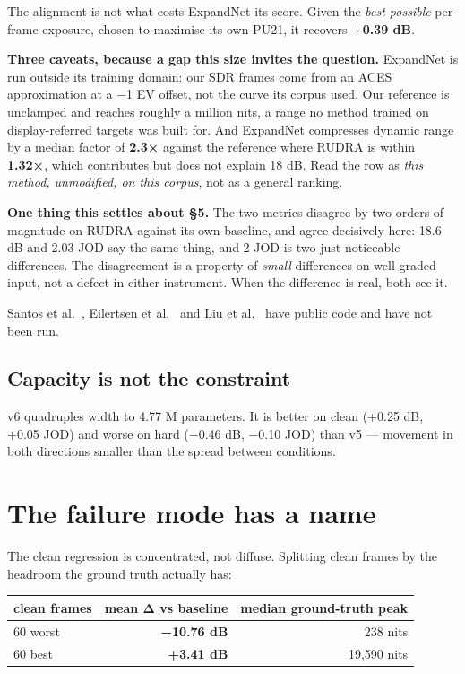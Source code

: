 The alignment is not what costs ExpandNet its score. Given the \emph{best possible}
per-frame exposure, chosen to maximise its own PU21, it recovers \textbf{+0.39 dB}.

\textbf{Three caveats, because a gap this size invites the question.} ExpandNet is
run outside its training domain: our SDR frames come from an ACES approximation
at a −1 EV offset, not the curve its corpus used. Our reference is unclamped and
reaches roughly a million nits, a range no method trained on display-referred targets
was built for. And ExpandNet compresses dynamic range by a median factor of
\textbf{2.3×} against the reference where RUDRA is within \textbf{1.32×}, which
contributes but does not explain 18 dB. Read the row as \emph{this method,
unmodified, on this corpus}, not as a general ranking.

\textbf{One thing this settles about §5.} The two metrics disagree by two orders of
magnitude on RUDRA against its own baseline, and agree decisively here: 18.6 dB
and 2.03 JOD say the same thing, and 2 JOD is two just-noticeable differences.
The disagreement is a property of \emph{small} differences on well-graded input, not
a defect in either instrument. When the difference is real, both see it.

Santos et al.~\cite{santos2020}, Eilertsen et al.~\cite{eilertsen2017} and Liu et al.~\cite{liu2020} have public code and
have not been run.

\hypertarget{capacity-is-not-the-constraint}{%
\subsection{Capacity is not the constraint}\label{capacity-is-not-the-constraint}}

v6 quadruples width to 4.77 M parameters. It is better on clean (+0.25 dB,
+0.05 JOD) and worse on hard (−0.46 dB, −0.10 JOD) than v5 --- movement in both
directions smaller than the spread between conditions.

\hypertarget{the-failure-mode-has-a-name}{%
\section{The failure mode has a name}\label{the-failure-mode-has-a-name}}

The clean regression is concentrated, not diffuse. Splitting clean frames by the
headroom the ground truth actually has:

\begin{longtable}[]{@{}lrr@{}}
\toprule
clean frames & mean Δ vs baseline & median ground-truth peak\tabularnewline
\midrule
\endhead
60 worst & \textbf{−10.76 dB} & 238 nits\tabularnewline
60 best & \textbf{+3.41 dB} & 19,590 nits\tabularnewline
\bottomrule
\end{longtable}


